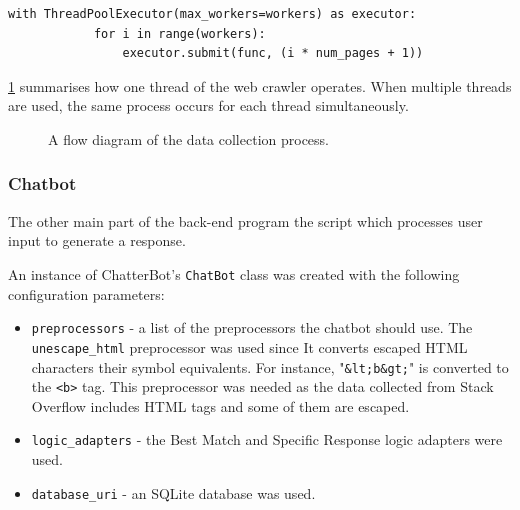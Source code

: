 \documentclass[12pt,a4paper]{article}
\newcommand{\captionstyle}[1] {
    \small{#1}
}
\begin{document}
\begin{lstlisting}[caption={\captionstyle{Multithreaded optimisation of the web crawler.}}, label={lst:threads}]
        with ThreadPoolExecutor(max_workers=workers) as executor:
            for i in range(workers):
                executor.submit(func, (i * num_pages + 1))
\end{lstlisting}

\cref{fig:crawlflow} summarises how one thread of the web crawler operates. When multiple threads are used, the same process occurs for each thread simultaneously.

\begin{figure}[htb]
	\centering
	\def\svgscale{0.7}
	\def\svgwidth{\columnwidth}
	
	\caption{\captionstyle{A flow diagram of the data collection process.}}
	\label{fig:crawlflow}
\end{figure}

\subsubsection{Chatbot}
The other main part of the back-end program the script which processes user input to generate a response. 

%
An instance of ChatterBot's \texttt{ChatBot} class was created with the following configuration parameters:
\begin{itemize}
	\item \texttt{preprocessors} - a list of the preprocessors the chatbot should use. The \texttt{unescape\_html} preprocessor was used since It converts escaped HTML characters their symbol equivalents. For instance, "\texttt{\&lt;b\&gt;}" is converted to the \texttt{<b>} tag. This preprocessor was needed as the data collected from Stack Overflow includes HTML tags and some of them are escaped.
	
	\item \texttt{logic\_adapters} - the Best Match and Specific Response logic adapters were used.
	
	\item \texttt{database\_uri} - an SQLite database was used.
\end{itemize}
\end{document}
